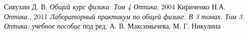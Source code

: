 \documentclass[12pt,a4paper]{article}
\begin{document}
\newpage
\begin{thebibliography}{9}
	 Сивухин Д. В. \emph{Общий курс физики. Том 4 Оптика}, 2004
	 Кириченко Н.А. \emph{Оптика.}, 2011
	 \emph{Лабораторный практикум по общей физике. В 3 томах. Том 3. Оптика: учебное пособие} под ред. А. В. Максимычева, М. Г. Никулина
\end{thebibliography}
\end{document}
